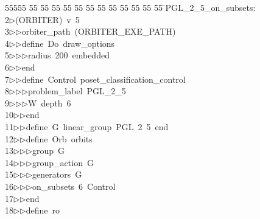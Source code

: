 %
%
\begin{tabbing}
55555 \= 55 \= 55 \= 55 \= 55 \= 55 \= 55 \= 55 \= 55 \= 55 \= 55 \= 55 \= 55 \= \>PGL\_2\_5\_on\_subsets:\\[0pt]
2\>$\triangleright$\>(ORBITER)\ v\ 5\ \\[0pt]
3\>$\triangleright$\>$\triangleright$\>orbiter\_path\ (ORBITER\_EXE\_PATH)\ \\[0pt]
4\>$\triangleright$\>$\triangleright$\>define\ Do\ draw\_options\ \\[0pt]
5\>$\triangleright$\>$\triangleright$\>$\triangleright$\>radius\ 200\ embedded\ \\[0pt]
6\>$\triangleright$\>$\triangleright$\>end\ \\[0pt]
7\>$\triangleright$\>$\triangleright$\>define\ Control\ poset\_classification\_control\ \\[0pt]
8\>$\triangleright$\>$\triangleright$\>$\triangleright$\>problem\_label\ PGL\_2\_5\ \\[0pt]
9\>$\triangleright$\>$\triangleright$\>$\triangleright$\>W\ depth\ 6\ \\[0pt]
10\>$\triangleright$\>$\triangleright$\>end\ \\[0pt]
11\>$\triangleright$\>$\triangleright$\>define\ G\ linear\_group\ PGL\ 2\ 5\ end\ \\[0pt]
12\>$\triangleright$\>$\triangleright$\>define\ Orb\ orbits\ \\[0pt]
13\>$\triangleright$\>$\triangleright$\>$\triangleright$\>group\ G\ \\[0pt]
14\>$\triangleright$\>$\triangleright$\>$\triangleright$\>group\_action\ G\ \\[0pt]
15\>$\triangleright$\>$\triangleright$\>$\triangleright$\>generators\ G\ \\[0pt]
16\>$\triangleright$\>$\triangleright$\>$\triangleright$\>on\_subsets\ 6\ Control\ \\[0pt]
17\>$\triangleright$\>$\triangleright$\>end\ \\[0pt]
18\>$\triangleright$\>$\triangleright$\>define\ ro\ \\[0pt]

\end{tabbing}
